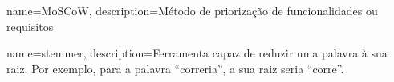 


{
   name=MoSCoW,
   description={Método de priorização de funcionalidades ou requisitos }
}


{
    name=stemmer,
    description={Ferramenta capaz de reduzir uma palavra à sua raiz. Por exemplo, para a palavra ``correria'', a sua raiz seria ``corre''. }
 }
